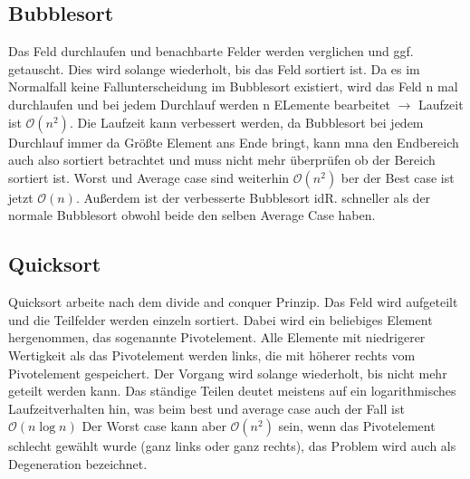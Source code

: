 \documentclass[a4paper]{scrartcl}
\begin{document}
        \subsection{Bubblesort}
            Das Feld durchlaufen und benachbarte Felder werden verglichen und ggf. getauscht. Dies wird solange wiederholt, bis das Feld sortiert ist. Da es im Normalfall
            keine Fallunterscheidung im Bubblesort existiert, wird das Feld n mal durchlaufen und bei jedem Durchlauf werden n ELemente bearbeitet \(\rightarrow\) 
            Laufzeit ist \(\mathcal{O}(n^2)\). Die Laufzeit kann verbessert werden, da Bubblesort bei jedem Durchlauf immer da Größte Element ans Ende bringt, 
            kann mna den Endbereich auch also sortiert betrachtet und muss nicht mehr überprüfen ob der Bereich sortiert ist.  Worst und Average case sind weiterhin
            \(\mathcal{O}(n^2)\) ber der Best case ist jetzt \(\mathcal{O}(n)\). Außerdem ist der verbesserte Bubblesort idR. schneller als der normale Bubblesort
            obwohl beide den selben Average Case haben.
        \subsection{Quicksort}
            Quicksort arbeite nach dem divide and conquer Prinzip. Das Feld wird aufgeteilt und die Teilfelder werden einzeln sortiert. Dabei wird ein
            beliebiges Element hergenommen, das sogenannte Pivotelement. Alle Elemente mit niedrigerer Wertigkeit als das Pivotelement werden links,
            die mit höherer rechts vom Pivotelement gespeichert. Der Vorgang wird solange wiederholt, bis nicht mehr geteilt werden kann. 
            Das ständige Teilen deutet meistens auf ein logarithmisches Laufzeitverhalten hin, was beim best und average case auch der Fall ist \(\mathcal{O}(n \log n)\)
            Der Worst case kann aber \(\mathcal{O}(n^2)\) sein, wenn das Pivotelement schlecht gewählt wurde (ganz links oder ganz rechts), das Problem wird 
            auch als Degeneration bezeichnet.
\end{document}
